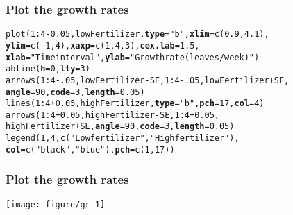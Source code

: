 \documentclass[color=usenames,dvipsnames]{beamer}\usepackage[]{graphicx}\usepackage[]{color}
\makeatletter
\newcommand{\hlnum}[1]{\textcolor[rgb]{0.69,0.494,0}{#1}}%
\newcommand{\hlstr}[1]{\textcolor[rgb]{0.749,0.012,0.012}{#1}}%
\newcommand{\hlopt}[1]{\textcolor[rgb]{0,0,0}{#1}}%
\newcommand{\hlstd}[1]{\textcolor[rgb]{0,0,0}{#1}}%
\newcommand{\hlkwc}[1]{\textcolor[rgb]{0,0,0}{\textbf{#1}}}%
\newcommand{\hlkwd}[1]{\textcolor[rgb]{0.004,0.004,0.506}{#1}}%
\newenvironment{kframe}{%
 \def\at@end@of@kframe{}%
 \ifinner\ifhmode%
  \def\at@end@of@kframe{\end{minipage}}%
  \begin{minipage}{\columnwidth}%
 \fi\fi%
 \def\FrameCommand##1{\hskip\@totalleftmargin \hskip-\fboxsep
 \colorbox{shadecolor}{##1}\hskip-\fboxsep
     \hskip-\linewidth \hskip-\@totalleftmargin \hskip\columnwidth}%
 \MakeFramed {\advance\hsize-\width
   \@totalleftmargin\z@ \linewidth\hsize
   \@setminipage}}%
 {\par\unskip\endMakeFramed%
 \at@end@of@kframe}
\newenvironment{knitrout}{}{} %
\makeatother
\begin{document}
\begin{frame}[fragile]
  \frametitle{Plot the growth rates}
\begin{knitrout}\footnotesize
{}\color{fgcolor}\begin{kframe}
\begin{alltt}
\hlkwd{plot}\hlstd{(}\hlnum{1}\hlopt{:}\hlnum{4}\hlopt{-}\hlnum{0.05}\hlstd{, lowFertilizer,} \hlkwc{type}\hlstd{=}\hlstr{"b"}\hlstd{,} \hlkwc{xlim}\hlstd{=}\hlkwd{c}\hlstd{(}\hlnum{0.9}\hlstd{,} \hlnum{4.1}\hlstd{),}
     \hlkwc{ylim}\hlstd{=}\hlkwd{c}\hlstd{(}\hlopt{-}\hlnum{1}\hlstd{,} \hlnum{4}\hlstd{),} \hlkwc{xaxp}\hlstd{=}\hlkwd{c}\hlstd{(}\hlnum{1}\hlstd{,}\hlnum{4}\hlstd{,}\hlnum{3}\hlstd{),} \hlkwc{cex.lab}\hlstd{=}\hlnum{1.5}\hlstd{,}
     \hlkwc{xlab}\hlstd{=}\hlstr{"Time interval"}\hlstd{,} \hlkwc{ylab}\hlstd{=}\hlstr{"Growth rate (leaves/week)"}\hlstd{)}
\hlkwd{abline}\hlstd{(}\hlkwc{h}\hlstd{=}\hlnum{0}\hlstd{,} \hlkwc{lty}\hlstd{=}\hlnum{3}\hlstd{)}
\hlkwd{arrows}\hlstd{(}\hlnum{1}\hlopt{:}\hlnum{4}\hlopt{-}\hlnum{.05}\hlstd{, lowFertilizer}\hlopt{-}\hlstd{SE,} \hlnum{1}\hlopt{:}\hlnum{4}\hlopt{-}\hlnum{.05}\hlstd{, lowFertilizer}\hlopt{+}\hlstd{SE,}
       \hlkwc{angle}\hlstd{=}\hlnum{90}\hlstd{,} \hlkwc{code}\hlstd{=}\hlnum{3}\hlstd{,} \hlkwc{length}\hlstd{=}\hlnum{0.05}\hlstd{)}
\hlkwd{lines}\hlstd{(}\hlnum{1}\hlopt{:}\hlnum{4}\hlopt{+}\hlnum{0.05}\hlstd{, highFertilizer,} \hlkwc{type}\hlstd{=}\hlstr{"b"}\hlstd{,} \hlkwc{pch}\hlstd{=}\hlnum{17}\hlstd{,} \hlkwc{col}\hlstd{=}\hlnum{4}\hlstd{)}
\hlkwd{arrows}\hlstd{(}\hlnum{1}\hlopt{:}\hlnum{4}\hlopt{+}\hlnum{0.05}\hlstd{, highFertilizer}\hlopt{-}\hlstd{SE,} \hlnum{1}\hlopt{:}\hlnum{4}\hlopt{+}\hlnum{0.05}\hlstd{,}
       \hlstd{highFertilizer}\hlopt{+}\hlstd{SE,} \hlkwc{angle}\hlstd{=}\hlnum{90}\hlstd{,} \hlkwc{code}\hlstd{=}\hlnum{3}\hlstd{,} \hlkwc{length}\hlstd{=}\hlnum{0.05}\hlstd{)}
\hlkwd{legend}\hlstd{(}\hlnum{1}\hlstd{,} \hlnum{4}\hlstd{,} \hlkwd{c}\hlstd{(}\hlstr{"Low fertilizer"}\hlstd{,} \hlstr{"High fertilizer"}\hlstd{),}
       \hlkwc{col}\hlstd{=}\hlkwd{c}\hlstd{(}\hlstr{"black"}\hlstd{,} \hlstr{"blue"}\hlstd{),} \hlkwc{pch}\hlstd{=}\hlkwd{c}\hlstd{(}\hlnum{1}\hlstd{,}\hlnum{17}\hlstd{))}
\end{alltt}
\end{kframe}
\end{knitrout}
\end{frame}






\begin{frame}[fragile]
  \frametitle{Plot the growth rates}
  \tiny
  \centering
    \texttt{[image: figure/gr-1]} \\
\end{frame}
\end{document}
